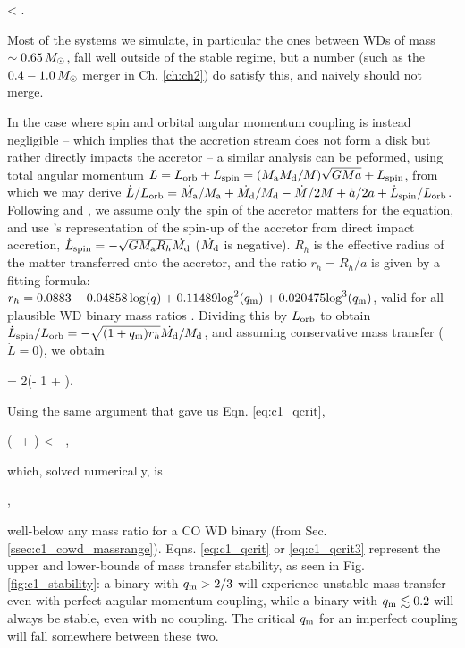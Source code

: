 \eqbegin
\qm < .
\label{eq:c1_qcrit}
\eqend

\noindent Most of the systems we simulate, in particular the ones between WDs of mass $\sim0.65\,\Msun$, fall well outside of the stable regime, but a number (such as the $0.4 - 1.0\,\Msun$ merger in Ch. \ref{ch:ch2}) do satisfy this, and naively should not merge.

In the case where spin and orbital angular momentum coupling is instead negligible -- which implies that the accretion stream does not form a disk but rather directly impacts the accretor \citep{nele+01} -- a similar analysis can be peformed, using total angular momentum $L = L_\mrm{orb} + L_\mrm{spin} = (\Ma\Md/M)\sqrt{GMa} + L_\mrm{spin}$, from which we may derive $\dot{L}/L_\mrm{orb} = \dot{\Ma}/\Ma + \dot{\Md}/\Md - \dot{M}/2M + \dot{a}/2a + \dot{L}_\mrm{spin}/L_\mrm{orb}$.  Following \cite{marsns04} and \cite{nele+01}, we assume only the spin of the accretor matters for the equation, and use \cite{verbr88}'s representation of the spin-up of the accretor from direct impact accretion, $\dot{L}_\mrm{spin} = -\sqrt{G\Ma R_h}\dot{\Md}$ ($\dot{\Md}$ is negative).  $R_h$ is the effective radius of the matter transferred onto the accretor, and the ratio $r_h = R_h/a$ is given by a fitting formula: $r_h = 0.0883 - 0.04858\log({q}) + 0.11489{\log}^2(\qm) + 0.020475{\log}^3(\qm)$, valid for all plausible WD binary mass ratios \citep{verbr88}.  Dividing this by $L_\mathrm{orb}$ to obtain $\dot{L}_\mrm{spin}/L_\mrm{orb} = -\sqrt{(1 + \qm)r_h}\dot{\Md}/\Md$, and assuming conservative mass transfer ($\dot{L} = 0$), we obtain \citep{marsns04,nele+01}

\eqbegin
{} = 2\left(\qm- 1 + \right)\frac{\dot{\Md}}{\Md}.
\label{eq:c1_adotovera2}
\eqend

\noindent Using the same argument that gave us Eqn. \ref{eq:c1_qcrit},

\left(\qm-  + \right) < - ,
\label{eq:c1_qcrit2}
\eqend

\noindent which, solved numerically, is

\eqbegin
\qm{},
\label{eq:c1_qcrit3}
\eqend

\noindent well-below any mass ratio for a CO WD binary (from Sec. \ref{ssec:c1_cowd_massrange}).  Eqns. \ref{eq:c1_qcrit} or \ref{eq:c1_qcrit3} represent the upper and lower-bounds of mass transfer stability, as seen in Fig. \ref{fig:c1_stability}: a binary with $\qm > 2/3$ will experience unstable mass transfer even with perfect angular momentum coupling, while a binary with $\qm \lesssim 0.2$ will always be stable, even with no coupling.  The critical $\qm$ for an imperfect coupling will fall somewhere between these two.

